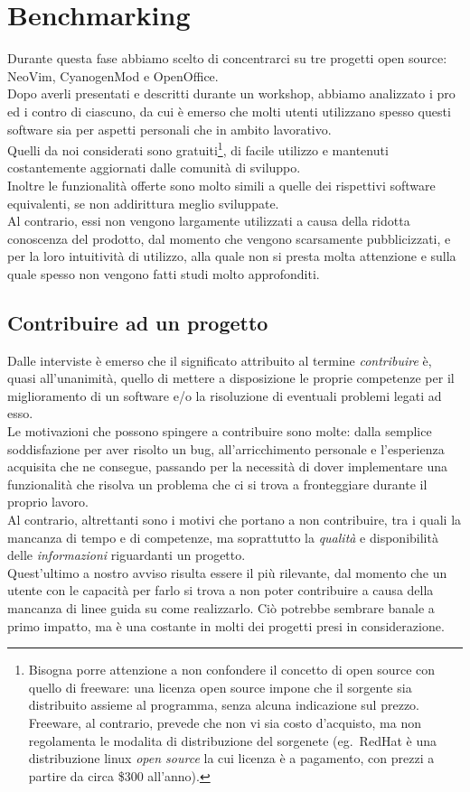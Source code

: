 \documentclass[12pt]{article} %
\begin{document}
\section{Benchmarking}
Durante questa fase abbiamo scelto di concentrarci su tre progetti open source: NeoVim, CyanogenMod e OpenOffice.\\
Dopo averli presentati e descritti durante un workshop, abbiamo analizzato i pro ed i contro di ciascuno, da cui \`e emerso che molti utenti utilizzano spesso questi software sia per aspetti personali che in ambito lavorativo.\\
Quelli da noi considerati sono gratuiti\footnote{Bisogna porre attenzione a non confondere il concetto di open source con quello di freeware: una licenza open source impone che il sorgente sia distribuito assieme al programma, senza alcuna indicazione sul prezzo. Freeware, al contrario, prevede che non vi sia costo d'acquisto, ma non regolamenta le modalita di distribuzione del sorgenete (eg.\ RedHat \`e una distribuzione linux \emph{open source} la cui licenza \`e a pagamento, con prezzi a partire da circa \$300 all'anno).}, di facile utilizzo e mantenuti costantemente aggiornati dalle comunit\`a di sviluppo.\\
Inoltre le funzionalit\`a offerte sono molto simili a quelle dei rispettivi software equivalenti, se non addirittura meglio sviluppate.\\
Al contrario, essi non vengono largamente utilizzati a causa della ridotta conoscenza del prodotto, dal momento che vengono scarsamente pubblicizzati, e per la loro intuitivit\`a di utilizzo, alla quale non si presta molta attenzione e sulla quale spesso non vengono fatti studi molto approfonditi.\\

\subsection{Contribuire ad un progetto}
\label{motivi}
Dalle interviste \`e emerso che il significato attribuito al termine \emph{contribuire} \`e, quasi all'unanimit\`a, quello di mettere a disposizione le proprie competenze per il miglioramento di un software e/o la risoluzione di eventuali problemi legati ad esso.\\
Le motivazioni che possono spingere a contribuire sono molte: dalla semplice soddisfazione per aver risolto un bug, all'arricchimento personale e l'esperienza acquisita che ne consegue, passando per la necessit\`a di dover implementare una funzionalit\`a che risolva un problema che ci si trova a fronteggiare durante il proprio lavoro.\\
Al contrario, altrettanti sono i motivi che portano a non contribuire, tra i quali la mancanza di tempo e di competenze, ma soprattutto la \emph{qualit\`a} e disponibilit\`a delle \emph{informazioni} riguardanti un progetto.\\
Quest'ultimo a nostro avviso risulta essere il pi\`u rilevante, dal momento che un utente con le capacit\`a per farlo si trova a non poter contribuire a causa della mancanza di linee guida su come realizzarlo. Ci\`o potrebbe sembrare banale a primo impatto, ma \`e una costante in molti dei progetti presi in considerazione.
\end{document}
